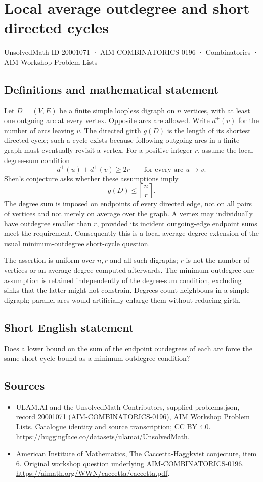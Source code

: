\documentclass[11pt,a4paper]{article}
\begin{document}
\section*{Local average outdegree and short directed cycles}\label{20001071}
{\small UnsolvedMath ID 20001071 · AIM-COMBINATORICS-0196 · Combinatorics · AIM Workshop Problem Lists}
\subsection{Definitions and mathematical statement}
Let $D=(V,E)$ be a finite simple loopless digraph on $n$ vertices,
with at least one outgoing arc at every vertex. Opposite arcs are
allowed. Write $d^+(v)$ for the number of arcs leaving $v$.
The directed girth $g(D)$ is the length of its shortest directed
cycle; such a cycle exists because following outgoing arcs in a
finite graph must eventually revisit a vertex.
For a positive integer $r$, assume the local degree-sum condition
\[
                       d^+(u)+d^+(v)\ge2r
                              \qquad\text{for every arc }u\to v.
\]
Shen's conjecture asks whether these assumptions imply
\[
                              g(D)\le\left\lceil\frac nr\right\rceil.
\]
The degree sum is imposed on endpoints of every directed edge, not
on all pairs of vertices and not merely on average over the graph.
A vertex may individually have outdegree smaller than $r$, provided
its incident outgoing-edge endpoint sums meet the requirement.
Consequently this is a local average-degree extension of the usual
minimum-outdegree short-cycle question.

The assertion is uniform over $n,r$ and all such digraphs; $r$ is not
the number of vertices or an average degree computed afterwards.
The minimum-outdegree-one assumption is retained independently of the
degree-sum condition, excluding sinks that the latter might not
constrain. Degrees count neighbours in a simple digraph; parallel
arcs would artificially enlarge them without reducing girth.
\subsection{Short English statement}
Does a lower bound on the sum of the endpoint outdegrees of each arc force the same short-cycle bound as a minimum-outdegree condition?
\subsection{Sources}
\begin{itemize}
\item[S1] ULAM.AI and the UnsolvedMath Contributors, supplied problems.json, record 20001071 (AIM-COMBINATORICS-0196), AIM Workshop Problem Lists. Catalogue identity and source transcription; CC BY 4.0.
\url{https://huggingface.co/datasets/ulamai/UnsolvedMath}.
\item[S2] American Institute of Mathematics, The Caccetta-Haggkvist conjecture, item 6. Original workshop question underlying AIM-COMBINATORICS-0196.
\url{https://aimath.org/WWN/caccetta/caccetta.pdf}.
\end{itemize}
\end{document}
